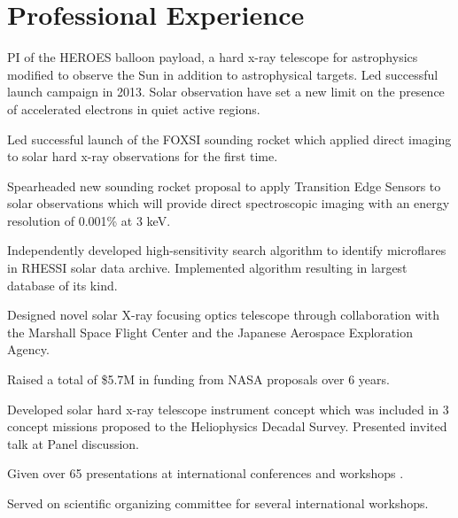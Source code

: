 \documentclass[11pt]{article}
\begin{document}
\section{Professional Experience}
\begin{itemize*}
 \item PI of the HEROES balloon payload, a hard x-ray telescope for astrophysics modified to observe the Sun in addition to astrophysical targets. Led successful launch campaign in 2013. Solar observation have set a new limit on the presence of accelerated electrons in quiet active regions.
 \item Led successful launch of the FOXSI sounding rocket which applied direct imaging to solar hard x-ray observations for the first time.
  \item Spearheaded new sounding rocket proposal to apply Transition Edge Sensors to solar observations which will provide direct spectroscopic imaging with an energy resolution of 0.001\% at 3 keV.
 \item Independently developed high-sensitivity search algorithm to identify microflares in RHESSI solar
data archive. Implemented algorithm resulting in largest database of its kind.
 \item Designed novel solar X-ray focusing optics telescope through collaboration with the Marshall Space Flight Center and the Japanese Aerospace Exploration Agency.
 \item Raised a total of \$5.7M in funding from NASA proposals over 6 years.
 \item Developed solar hard x-ray telescope instrument concept which was included in 3 concept missions proposed to the Heliophysics Decadal Survey. Presented invited talk at Panel discussion.
 \item Given over 65 presentations at international conferences and workshops .
 \item Served on scientific organizing committee for several international workshops.
\end{itemize*} 
\end{document}
